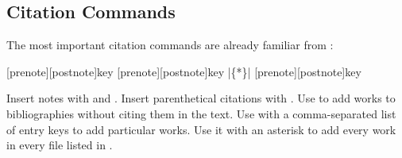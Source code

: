 \documentclass[11pt,letterpaper,oneside]{article}
\begin{document}
\subsection{Citation Commands}
\label{citecmds}

The most important citation commands are already familiar from
\biblatex:

\begin{ltxsyntax}
[prenote][postnote]{key}
[prenote][postnote]{key}
|\{*\}|
[prenote][postnote]{key}
\end{ltxsyntax}

\noindent Insert notes with  and . Insert
parenthetical citations with . Use  to add
works to bibliographies without citing them in the text. Use
 with a comma-separated list of entry keys to add
particular works. Use it with an asterisk to add every work in every
 file listed in .
\end{document}
